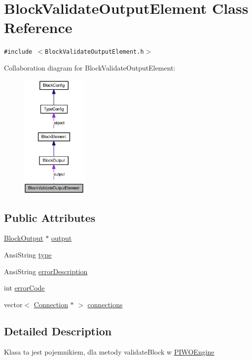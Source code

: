 \hypertarget{classBlockValidateOutputElement}{
\section{BlockValidateOutputElement Class Reference}
\label{classBlockValidateOutputElement}
}
{\tt \#include $<$BlockValidateOutputElement.h$>$}

Collaboration diagram for BlockValidateOutputElement:\nopagebreak
\begin{figure}[H]
\begin{center}
\leavevmode
\includegraphics[width=92pt]{classBlockValidateOutputElement__coll__graph}
\end{center}
\end{figure}
\subsection*{Public Attributes}
\begin{CompactItemize}
\item 
\hyperlink{classBlockOutput}{BlockOutput} $\ast$ \hyperlink{classBlockValidateOutputElement_6dba2211ec248d6b57551f067689b7e6}{output}
\item 
AnsiString \hyperlink{classBlockValidateOutputElement_86efbb4dff759a82c0d7bf58889f7d54}{type}
\item 
AnsiString \hyperlink{classBlockValidateOutputElement_d063a4632a943e2972bba2dd77a77d02}{errorDescription}
\item 
int \hyperlink{classBlockValidateOutputElement_47eb7f8967002402ac8d4b1d6ec3abbf}{errorCode}
\item 
vector$<$ \hyperlink{classConnection}{Connection} $\ast$ $>$ \hyperlink{classBlockValidateOutputElement_7d6a09dcdc47578fe0580f342e45b78a}{connections}
\end{CompactItemize}


\subsection{Detailed Description}
Klasa ta jest pojemnikiem, dla metody validateBlock w \hyperlink{classPIWOEngine}{PIWOEngine} 

